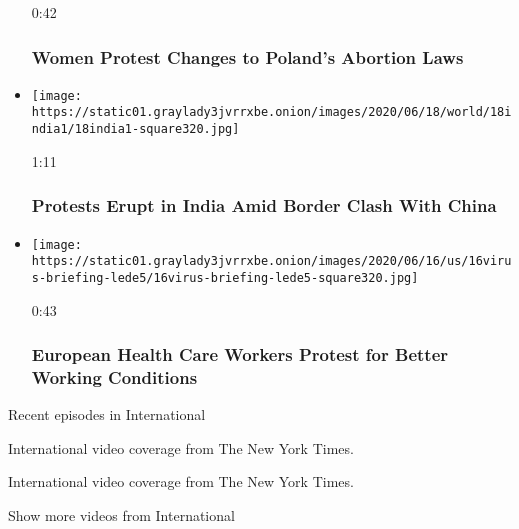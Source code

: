 \begin{itemize}
  0:42

  \hypertarget{women-protest-changes-to-polands-abortion-laws}{%
  \subsubsection{Women Protest Changes to Poland's Abortion
  Laws}\label{women-protest-changes-to-polands-abortion-laws}}
\item
  \href{https://www.nytimes3xbfgragh.onion/video/world/asia/100000007197958/anti-china-protests-india.html?action=click\&module=video-series-bar\&region=header\&pgtype=Article\&playlistId=video/world}{}

  \texttt{[image: https://static01.graylady3jvrrxbe.onion/images/2020/06/18/world/18india1/18india1-square320.jpg]}

  1:11

  \hypertarget{protests-erupt-in-india-amid-border-clash-with-china}{%
  \subsubsection{Protests Erupt in India Amid Border Clash With
  China}\label{protests-erupt-in-india-amid-border-clash-with-china}}
\item
  \href{https://www.nytimes3xbfgragh.onion/video/us/100000007194473/european-health-care-workers-protest-for-better-working-conditions.html?action=click\&module=video-series-bar\&region=header\&pgtype=Article\&playlistId=video/world}{}

  \texttt{[image: https://static01.graylady3jvrrxbe.onion/images/2020/06/16/us/16virus-briefing-lede5/16virus-briefing-lede5-square320.jpg]}

  0:43

  \hypertarget{european-health-care-workers-protest-for-better-working-conditions}{%
  \subsubsection{European Health Care Workers Protest for Better Working
  Conditions}\label{european-health-care-workers-protest-for-better-working-conditions}}
\end{itemize}

Recent episodes in International

International video coverage from The New York Times.

International video coverage from The New York Times.

Show more videos from International

